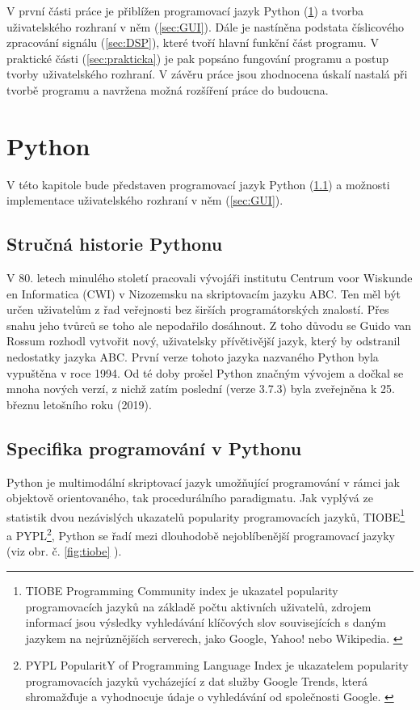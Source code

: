 \documentclass[a4paper, 12pt]{article}
\begin{document}
V první části práce je přiblížen programovací jazyk Python (\ref{sec:python}) a tvorba uživatelského rozhraní v něm (\ref{sec:GUI}). Dále je nastíněna podstata číslicového zpracování signálu (\ref{sec:DSP}), které tvoří hlavní funkční část programu. V praktické části (\ref{sec:prakticka}) je pak popsáno fungování programu a postup tvorby uživatelského rozhraní. V závěru práce jsou zhodnocena úskalí nastalá při tvorbě programu a navržena možná rozšíření práce do budoucna.

\section{Python} \label{sec:python}
V této kapitole bude představen programovací jazyk Python (\ref{sec:history}) a možnosti implementace uživatelského rozhraní v něm (\ref{sec:GUI}).
\subsection{Stručná historie Pythonu} \label{sec:history}
V 80. letech minulého století pracovali vývojáři institutu Centrum voor Wiskunde en Informatica (CWI) v Nizozemsku na skriptovacím jazyku ABC.  Ten měl být určen uživatelům z řad veřejnosti bez širších programátorských znalostí. \cite{PythonHist:1} Přes snahu jeho tvůrců se toho ale nepodařilo dosáhnout. Z toho důvodu se Guido van Rossum rozhodl vytvořit nový, uživatelsky přívětivější jazyk, který by odstranil nedostatky jazyka ABC. První verze tohoto jazyka nazvaného Python byla vypuštěna v roce 1994. \cite{PythonHist:2} Od té doby prošel Python značným vývojem a dočkal se mnoha nových verzí, z nichž zatím poslední (verze 3.7.3) byla zveřejněna k 25. březnu letošního roku (2019). \cite{PythonVersion}

\subsection{Specifika programování v Pythonu} \label{sec:specifika}

Python je multimodální skriptovací jazyk umožňující programování v rámci jak objektově orientovaného, tak procedurálního paradigmatu. \cite{Python3Summerfield:1}
Jak vyplývá ze statistik dvou nezávislých ukazatelů popularity programovacích jazyků, TIOBE\footnote{TIOBE Programming Community index je ukazatel popularity programovacích jazyků na základě počtu aktivních uživatelů, zdrojem informací jsou výsledky vyhledávání klíčových slov souvisejících s daným jazykem na nejrůznějších serverech, jako Google, Yahoo! nebo Wikipedia. \cite{tiobe}} a PYPL\footnote{PYPL PopularitY of Programming Language Index je ukazatelem popularity programovacích jazyků vycházející z dat služby Google Trends, která shromažďuje a vyhodnocuje údaje o vyhledávání od společnosti Google. \cite{pypl}}, Python se řadí mezi dlouhodobě nejoblíbenější programovací jazyky (viz obr. č. \ref{fig:tiobe} \cite{tiobe}).
\end{document}
